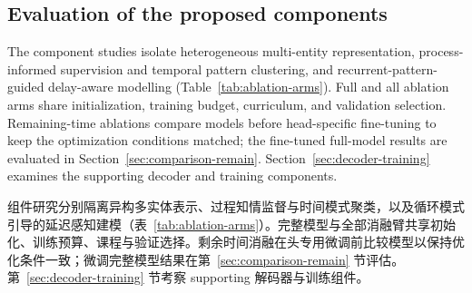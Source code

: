 \documentclass[a4paper,fleqn]{cas-dc}
\newcommand{\zhpara}[1]{%
  \par\begingroup\small\color{black!72}\noindent #1\par\endgroup}
\begin{document}
\subsection{Evaluation of the proposed components}

The component studies isolate heterogeneous multi-entity representation, process-informed supervision and temporal pattern clustering, and recurrent-pattern-guided delay-aware modelling (Table~\ref{tab:ablation-arms}). Full and all ablation arms share initialization, training budget, curriculum, and validation selection. Remaining-time ablations compare models before head-specific fine-tuning to keep the optimization conditions matched; the fine-tuned full-model results are evaluated in Section~\ref{sec:comparison-remain}. Section~\ref{sec:decoder-training} examines the supporting decoder and training components.

\zhpara{组件研究分别隔离异构多实体表示、过程知情监督与时间模式聚类，以及循环模式引导的延迟感知建模（表~\ref{tab:ablation-arms}）。完整模型与全部消融臂共享初始化、训练预算、课程与验证选择。剩余时间消融在头专用微调前比较模型以保持优化条件一致；微调完整模型结果在第~\ref{sec:comparison-remain} 节评估。第~\ref{sec:decoder-training} 节考察 supporting 解码器与训练组件。}
\end{document}
